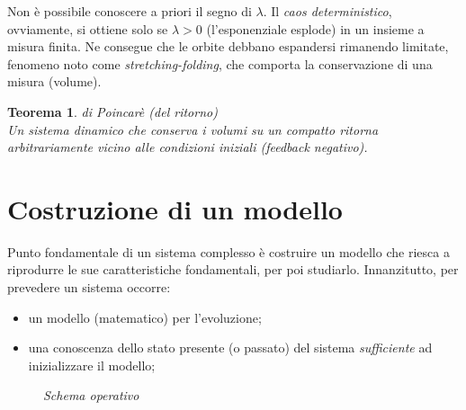 \documentclass[12pt, a4paper]{book}
\theoremstyle{theorem}
\newtheorem{theorem}{Teorema}[section]
\begin{document}
			Non è possibile conoscere a priori il segno di $\lambda$.
			Il \emph{caos deterministico}, ovviamente, si ottiene solo se $\lambda>0$ (l'esponenziale esplode) in un insieme a misura finita.
			Ne consegue che le orbite debbano espandersi rimanendo limitate, fenomeno noto come \emph{stretching-folding}, che comporta la conservazione di una misura (volume).
			\begin{theorem}
				di Poincarè (del ritorno)
				\\Un sistema dinamico che conserva i volumi su un compatto ritorna arbitrariamente vicino alle condizioni iniziali (feedback negativo).
				\label{theorem:poincare}
			\end{theorem}
		
		\section{Costruzione di un modello}
			Punto fondamentale di un sistema complesso è costruire un modello che riesca a riprodurre le sue caratteristiche fondamentali, per poi studiarlo.
			Innanzitutto, per prevedere un sistema occorre:
			\begin{itemize}
				\item un modello (matematico) per l'evoluzione;
				\item una conoscenza dello stato presente (o passato) del sistema \emph{sufficiente} ad inizializzare il modello;
			\end{itemize}
			\begin{figure}[H]
				\centering
				\caption{\emph{Schema operativo}}
				\label{figure:schema_operativo}
			\end{figure}
\end{document}
